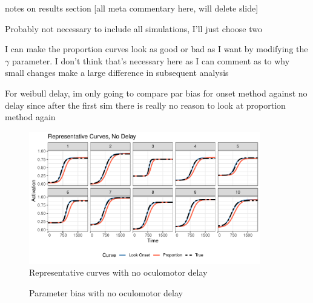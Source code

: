 \documentclass{beamer}
\newcommand{\vp}{\vspace{2mm}}
\begin{document}
\begin{frame}{notes on results section}
[all meta commentary here, will delete slide] \vp

Probably not necessary to include all simulations, I'll just choose two \vp

I can make the proportion curves look as good or bad as I want by modifying  the $\gamma$ parameter. I don't think that's necessary here as I can comment as to why small changes make a large difference in subsequent analysis \vp

For weibull delay, im only going to compare par bias for onset method against no delay since after the first sim there is really no reason to look at proportion method again
\end{frame}


\begin{frame}
\begin{figure}[H]
\centering
\includegraphics[width=0.9\textwidth]{rep_curves_no_delay.pdf}
\caption{Representative curves with no oculomotor delay}
\label{fig:rep_curves_no_delay}
\end{figure}
\end{frame}


\begin{frame}
\begin{figure}[H]
\centering
\caption{Parameter bias with no oculomotor delay}
\label{fig:par_bias_no_delay}
\end{figure}
\end{frame}
\end{document}
